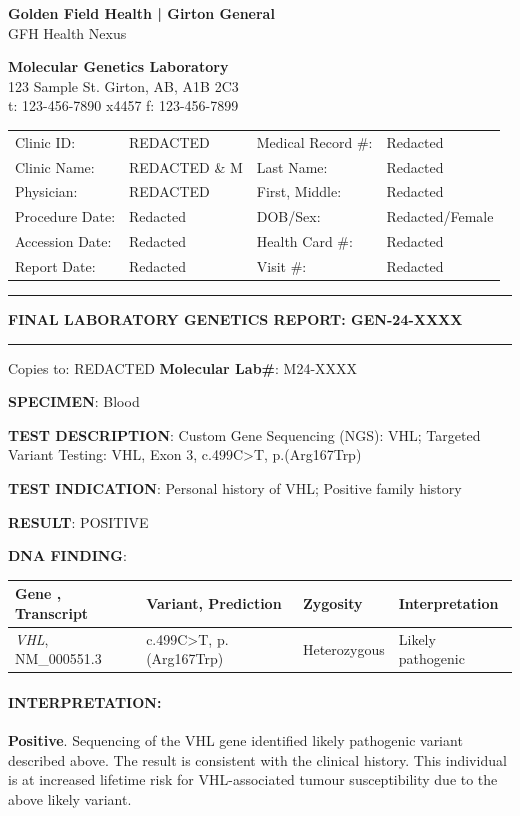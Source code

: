 \documentclass[10pt]{extarticle}
\begin{document}
\parbox[t][][]{.38\textwidth}{
{\large \bf Golden Field Health | Girton General}\\
GFH Health Nexus
}
\hfill
\parbox[t][][]{.55\textwidth}{
{\large \bf Molecular Genetics Laboratory }\\
{\scriptsize 123 Sample St. Girton, AB, A1B 2C3 \\
t: 123-456-7890 x4457 f: 123-456-7899}
}

\begin{tabular}{l l l l}
Clinic ID: & REDACTED & Medical Record \#:& Redacted \\
Clinic Name: & REDACTED \& M & Last Name:& Redacted \\
Physician: & REDACTED & First, Middle:& Redacted\\
Procedure Date: & Redacted& DOB/Sex: & Redacted/Female \\
Accession Date: & Redacted & Health Card \#:&  Redacted \\
Report Date: & Redacted & Visit \#:&  Redacted \\
\end{tabular}

\vspace{1em}
\rule{\textwidth}{1pt}

{\Large \bf FINAL LABORATORY GENETICS REPORT: \hfill GEN-24-XXXX}
\rule{\textwidth}{1pt}


Copies to: REDACTED \hfill {\bf Molecular Lab\#}: M24-XXXX

{\bf SPECIMEN}: Blood

{\bf TEST DESCRIPTION}: Custom Gene Sequencing (NGS): VHL; Targeted Variant Testing: VHL, Exon 3, c.499C>T, p.(Arg167Trp)

{\bf TEST INDICATION}: Personal history of VHL; Positive family history

{\bf RESULT}: POSITIVE

{\bf DNA FINDING}:\\ 
\begin{tabular}{ | l | l | l | l | }
\hline
{\bf Gene , Transcript} & {\bf Variant, Prediction} & {\bf Zygosity} & {\bf Interpretation} \\ \hline
{\it VHL}, NM\_000551.3 & c.499C>T, p.(Arg167Trp) & Heterozygous & Likely pathogenic \\ \hline
\end{tabular}

\paragraph{INTERPRETATION:} {\bf Positive}. Sequencing of the VHL gene identified likely pathogenic variant described above.
The result is consistent with the clinical history. This individual is at increased lifetime risk for VHL-associated tumour susceptibility due to the above likely variant.
\end{document}
